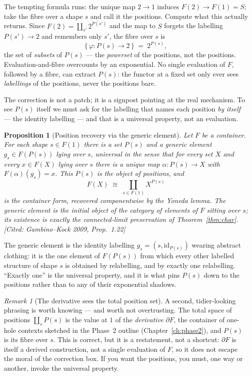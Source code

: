 \documentclass[11pt,a4paper]{book}
\newcommand{\id}{\mathrm{id}}
\theoremstyle{plain}
\newtheorem{Proposition}[Theorem]{Proposition}
\theoremstyle{definition}
\theoremstyle{remark}
\newtheorem{Remark}[Theorem]{Remark}
\newcommand{\prov}[1]{\hfill\textsf{\footnotesize[#1]}}
\begin{document}
\begin{teachbox}
The tempting formula runs: the unique map $2\to1$ induces $F(2)\to F(1)=S$; take the
fibre over a shape $s$ and call it the positions. Compute what this actually
returns. Since $F(2)=\coprod_{s'}2^{P(s')}$ and the map to $S$ forgets the labelling
$P(s')\to2$ and remembers only $s'$, the fibre over $s$ is
\[
  \bigl\{\,\varphi\colon P(s)\to 2\,\bigr\} \;=\; 2^{P(s)},
\]
the set of \emph{subsets} of $P(s)$ --- the \emph{powerset} of the positions, not
the positions. Evaluation-and-fibre overcounts by an exponential. No single
evaluation of $F$, followed by a fibre, can extract $P(s)$: the functor at a fixed
set only ever sees \emph{labellings} of the positions, never the positions bare.
\end{teachbox}

The correction is not a patch; it is a signpost pointing at the real mechanism. To
see $P(s)$ itself we must ask for the labelling that names each position \emph{by
itself} --- the identity labelling --- and that is a universal property, not an
evaluation.

\begin{Proposition}[Position recovery via the generic element]\label{prop:recover}
Let $F$ be a container. For each shape $s\in F(1)$ there is a set $P(s)$ and a
\emph{generic element} $g_s\in F(P(s))$ lying over $s$, universal in the sense that
for every set $X$ and every $x\in F(X)$ lying over $s$ there is a unique map
$\alpha\colon P(s)\to X$ with $F(\alpha)(g_s)=x$. This $P(s)$ is the object of
positions, and
\[
  F(X)\;\cong\;\coprod_{s\in F(1)} X^{P(s)}
\]
is the container form, recovered componentwise by the Yoneda lemma. The generic
element is the initial object of the category of elements of $F$ sitting over $s$;
its existence is exactly the connected-limit preservation of
Theorem~\ref{thm:char}.
\prov{Cited: Gambino--Kock 2009, Prop.~1.22}
\end{Proposition}

The generic element is the identity labelling $g_s=(s,\id_{P(s)})$ wearing abstract
clothing: it is the one element of $F(P(s))$ from which every other labelled
structure of shape $s$ is obtained by relabelling, and by exactly one relabelling.
``Exactly one'' is the universal property, and it is what pins $P(s)$ down to the
positions rather than to any of their exponential shadows.

\begin{Remark}[The derivative sees the total position set]
A second, tidier-looking phrasing is worth knowing --- and worth not overtrusting.
The total space of positions $\coprod_s P(s)$ is the value at $1$ of the
\emph{derivative} $\partial F$, the container of one-hole contexts sketched in the
Phase~2 outline (Chapter~\ref{ch:phase2}), and $P(s)$ is its fibre over $s$. This is
correct, but it is a restatement, not a shortcut: $\partial F$ is itself a derived
construction, not a single evaluation of $F$, so it does not escape the moral of the
correction box. If you want the positions, you must, one way or another, invoke the
universal property.
\end{Remark}
\end{document}
